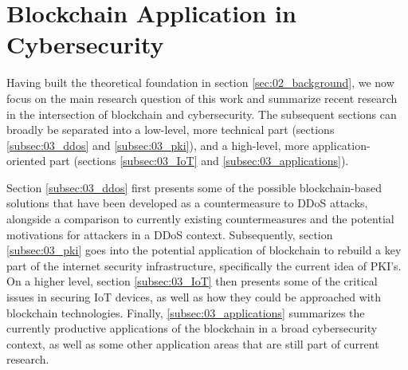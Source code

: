 \section{Blockchain Application in Cybersecurity}
\label{sec:03_related_work}

Having built the theoretical foundation in section \ref{sec:02_background}, we now focus on the main research question of this work and summarize recent research in the intersection of blockchain and cybersecurity. The subsequent sections can broadly be separated into a low-level, more technical part (sections \ref{subsec:03_ddos} and \ref{subsec:03_pki}), and a high-level, more application-oriented part (sections \ref{subsec:03_IoT} and \ref{subsec:03_applications}).

Section \ref{subsec:03_ddos} first presents some of the possible blockchain-based solutions that have been developed as a countermeasure to DDoS attacks, alongside a comparison to currently existing countermeasures and the potential motivations for attackers in a DDoS context. Subsequently, section \ref{subsec:03_pki} goes into the potential application of blockchain to rebuild a key part of the internet security infrastructure, specifically the current idea of PKI's. On a higher level, section \ref{subsec:03_IoT} then presents some of the critical issues in securing IoT devices, as well as how they could be approached with blockchain technologies. Finally, \ref{subsec:03_applications} summarizes the currently productive applications of the blockchain in a broad cybersecurity context, as well as some other application areas that are still part of current research.





